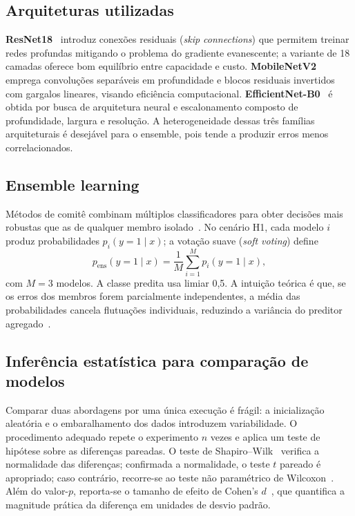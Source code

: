 \documentclass[conference]{IEEEtran}
\begin{document}
\subsection{Arquiteturas utilizadas}
\textbf{ResNet18}~\cite{he2016deep} introduz conexões residuais (\emph{skip connections}) que permitem treinar redes profundas mitigando o problema do gradiente evanescente; a variante de 18 camadas oferece bom equilíbrio entre capacidade e custo. \textbf{MobileNetV2}~\cite{sandler2018mobilenetv2} emprega convoluções separáveis em profundidade e blocos residuais invertidos com gargalos lineares, visando eficiência computacional. \textbf{EfficientNet-B0}~\cite{tan2019efficientnet} é obtida por busca de arquitetura neural e escalonamento composto de profundidade, largura e resolução. A heterogeneidade dessas três famílias arquiteturais é desejável para o ensemble, pois tende a produzir erros menos correlacionados.

\subsection{Ensemble learning}
Métodos de comitê combinam múltiplos classificadores para obter decisões mais robustas que as de qualquer membro isolado~\cite{dietterich2000ensemble,breiman1996bagging}. No cenário H1, cada modelo $i$ produz probabilidades $p_i(y{=}1 \mid x)$; a votação suave (\emph{soft voting}) define
\begin{equation}
p_{\mathrm{ens}}(y{=}1 \mid x) = \frac{1}{M}\sum_{i=1}^{M} p_i(y{=}1 \mid x),
\end{equation}
com $M=3$ modelos. A classe predita usa limiar 0,5. A intuição teórica é que, se os erros dos membros forem parcialmente independentes, a média das probabilidades cancela flutuações individuais, reduzindo a variância do preditor agregado~\cite{ganaie2022ensemble}.

\subsection{Inferência estatística para comparação de modelos}
Comparar duas abordagens por uma única execução é frágil: a inicialização aleatória e o embaralhamento dos dados introduzem variabilidade. O procedimento adequado repete o experimento $n$ vezes e aplica um teste de hipótese sobre as diferenças pareadas. O teste de Shapiro--Wilk~\cite{shapiro1965analysis} verifica a normalidade das diferenças; confirmada a normalidade, o teste $t$ pareado é apropriado; caso contrário, recorre-se ao teste não paramétrico de Wilcoxon~\cite{wilcoxon1945individual}. Além do valor-$p$, reporta-se o tamanho de efeito de Cohen's $d$~\cite{cohen1988statistical}, que quantifica a magnitude prática da diferença em unidades de desvio padrão.
\end{document}
